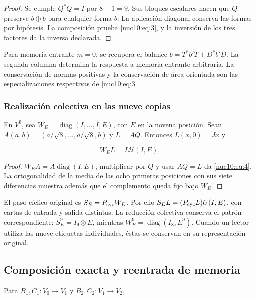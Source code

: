 \begin{proof}
Se cumple \(Q^*Q=I\) por \(8+1=9\). Sus bloques escalares hacen que \(Q\) preserve \(b\oplus b\) para cualquier forma \(b\). La aplicación diagonal conserva las formas por hipótesis. La composición prueba \eqref{nuc10:eq:3}, y la inversión de los tres factores da la inversa declarada.
\end{proof}

Para memoria entrante \(m=0\), se recupera el balance \(b=T^*b'T+D^*b'D\). La segunda columna determina la respuesta a memoria entrante arbitraria. La conservación de normas positivas y la conservación de área orientada son las especializaciones respectivas de \eqref{nuc10:eq:3}.

\subsubsection{Realización colectiva en las nueve copias}

En \(V^9\), sea \(W_E=\operatorname{diag}(I,\ldots,I,E)\), con \(E\) en la novena posición. Sean \(A(a,b)=(a/\sqrt8,\ldots,a/\sqrt8,b)\) y \(L=AQ\). Entonces \(L(x,0)=Jx\) y



\begin{equation}
W_E L=L\mathcal U(I,E).
\label{nuc10:eq:4}
\end{equation}



\begin{proof}
\(W_EA=A\operatorname{diag}(I,E)\); multiplicar por \(Q\) y usar \(AQ=L\) da \eqref{nuc10:eq:4}. La ortogonalidad de la media de las ocho primeras posiciones con sus siete diferencias muestra además que el complemento queda fijo bajo \(W_E\).
\end{proof}

El paso cíclico original es \(S_E=P_{\rm cyc}W_E\). Por ello \(S_EL=(P_{\rm cyc}L)U(I,E)\), con cartas de entrada y salida distintas. La reducción colectiva conserva el patrón correspondiente: \(S_E^9=I_9\otimes E\), mientras \(W_E^9=\operatorname{diag}(I_8,E^9)\). Cuando un lector utiliza las nueve etiquetas individuales, éstas se conservan en su representación original.

\subsection{Composición exacta y reentrada de memoria}

Para \(B_1,C_1:V_0\to V_1\) y \(B_2,C_2:V_1\to V_2\),



